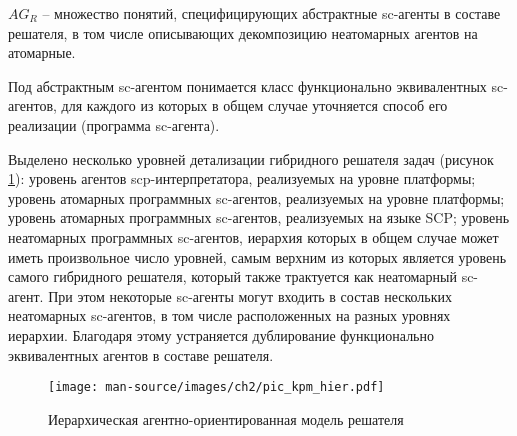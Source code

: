 \documentclass{thesisby}
\begin{document}

\parindent=9mm \hangindent=25mm 
$AG_R$ – множество понятий, специфицирующих абстрактные sc-агенты в составе решателя, в том числе описывающих декомпозицию неатомарных агентов на атомарные.

\medskip
\parindent=1cm

Под абстрактным sc-агентом понимается класс функционально эквивалентных sc-агентов, для каждого из которых в общем случае уточняется способ его реализации (программа sc-агента). 



Выделено несколько уровней детализации гибридного решателя задач (рисунок \ref{fig:pic_kpm_hier}): уровень агентов scp-интерпретатора, реализуемых на уровне платформы; уровень атомарных программных sc-агентов, реализуемых на уровне платформы; уровень атомарных программных sc-агентов, реализуемых на языке SCP; уровень неатомарных программных sc-агентов, иерархия которых в общем случае может иметь произвольное число уровней, самым верхним из которых является уровень самого гибридного решателя, который также трактуется как неатомарный sc-агент. При этом некоторые sc-агенты могут входить в состав нескольких неатомарных sc-агентов, в том числе расположенных на разных уровнях иерархии. Благодаря этому устраняется дублирование функционально эквивалентных агентов в составе решателя.

\begin{figure}[H]
    \centering
    \texttt{[image: man-source/images/ch2/pic\_kpm\_hier.pdf]}
    \caption{Иерархическая агентно-ориентированная модель решателя}
    \label{fig:pic_kpm_hier}
\end{figure}

\iffalse
\begin{figure}[H]
    \centering
    \texttt{[image: man-source/images/ch2/pic\_ips.png]}
    \caption{Детализированная схема обработки информации в интеллектуальной системе}
    \label{fig:pic_ips}
\end{figure}
\fi
\end{document}
